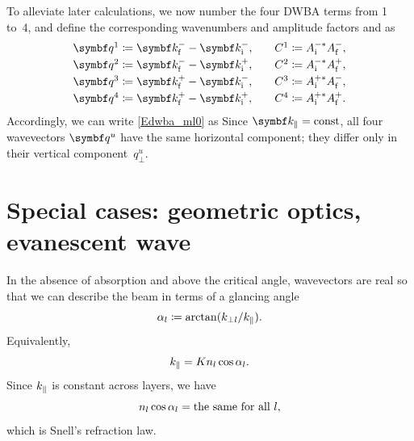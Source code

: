 To alleviate later calculations,
we now number the four DWBA terms from 1 to~4,
and define the corresponding wavenumbers and amplitude factors and as
\begin{equation}
  \begin{array}{l@{\hspace{2em}}l}
    \q^1 \coloneqq  \k^-_\tf - \k^-_\ti,& C^1 \coloneqq  A^{-*}_\ti A^-_\tf, \\[.6ex]
    \q^2 \coloneqq  \k^-_\tf - \k^+_\ti,& C^2 \coloneqq  A^{-*}_\ti A^+_\tf, \\[.6ex]
    \q^3 \coloneqq  \k^+_\tf - \k^-_\ti,& C^3 \coloneqq  A^{+*}_\ti A^-_\tf, \\[.6ex]
    \q^4 \coloneqq  \k^+_\tf - \k^+_\ti,& C^4 \coloneqq  A^{+*}_\ti A^+_\tf.
  \end{array}
\end{equation}
Accordingly, we can write \cref{Edwba_ml0} as
Since $\k_\parallel=\text{const}$,
 all four wavevectors $\q^u$ have the same horizontal component;
they differ only in their vertical component~$q^u_\perp$.

\section{Special cases: geometric optics, evanescent wave}\label{SSpecial}

In the absence of absorption and above the critical angle,
wavevectors are real
so that we can describe the beam in terms of a glancing angle
\begin{equation}\label{Edef_alpha}
  \alpha_{l}\coloneqq \arctan(k_{\perp l}/k_{\parallel}).
\end{equation}
Equivalently,
\begin{equation}
  k_{\parallel}=K n_l \cos\alpha_{l}.
\end{equation}
Since $k_{\parallel}$ is constant across layers,
we have
\begin{equation}\label{ESnell}
  n_l \cos\alpha_{l} = \text{the same for all }l,
\end{equation}
which is Snell's refraction law.


